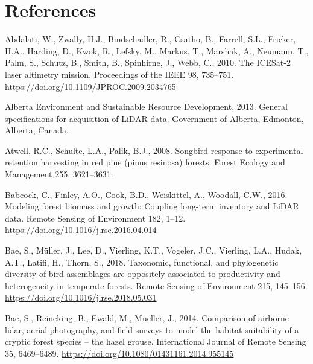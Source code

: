 \documentclass[
  12pt,
]{article}
\newlength{\cslhangindent}
\newlength{\cslentryspacingunit} %
\newenvironment{CSLReferences}[2] %
 {%
  \setlength{\parindent}{0pt}
  \ifodd #1
  \let\oldpar\par
  \def\par{\hangindent=\cslhangindent\oldpar}
  \fi
  \setlength{\parskip}{#2\cslentryspacingunit}
 }%
 {}
\begin{document}
\pagebreak

\hypertarget{references}{%
\section*{References}\label{references}}

\hypertarget{refs}{}
\begin{CSLReferences}{1}{0}
\leavevmode{}%
Abdalati, W., Zwally, H.J., Bindschadler, R., Csatho, B., Farrell, S.L., Fricker, H.A., Harding, D., Kwok, R., Lefsky, M., Markus, T., Marshak, A., Neumann, T., Palm, S., Schutz, B., Smith, B., Spinhirne, J., Webb, C., 2010. The {ICESat}-2 laser altimetry mission. Proceedings of the {IEEE} 98, 735--751. \url{https://doi.org/10.1109/JPROC.2009.2034765}

\leavevmode{}%
Alberta Environment and Sustainable Resource Development, 2013. General specifications for acquisition of {LiDAR} data. Government of Alberta, Edmonton, Alberta, Canada.

\leavevmode{}%
Atwell, R.C., Schulte, L.A., Palik, B.J., 2008. Songbird response to experimental retention harvesting in red pine (pinus resinosa) forests. Forest Ecology and Management 255, 3621--3631.

\leavevmode{}%
Babcock, C., Finley, A.O., Cook, B.D., Weiskittel, A., Woodall, C.W., 2016. Modeling forest biomass and growth: Coupling long-term inventory and {LiDAR} data. Remote Sensing of Environment 182, 1--12. \url{https://doi.org/10.1016/j.rse.2016.04.014}

\leavevmode{}%
Bae, S., Müller, J., Lee, D., Vierling, K.T., Vogeler, J.C., Vierling, L.A., Hudak, A.T., Latifi, H., Thorn, S., 2018. Taxonomic, functional, and phylogenetic diversity of bird assemblages are oppositely associated to productivity and heterogeneity in temperate forests. Remote Sensing of Environment 215, 145--156. \url{https://doi.org/10.1016/j.rse.2018.05.031}

\leavevmode{}%
Bae, S., Reineking, B., Ewald, M., Mueller, J., 2014. Comparison of airborne lidar, aerial photography, and field surveys to model the habitat suitability of a cryptic forest species -- the hazel grouse. International Journal of Remote Sensing 35, 6469--6489. \url{https://doi.org/10.1080/01431161.2014.955145}


\end{CSLReferences}
\end{document}
